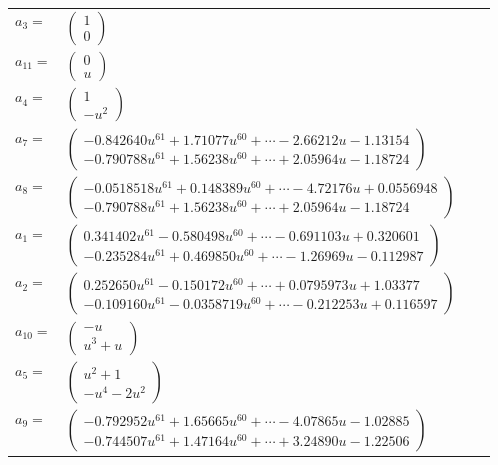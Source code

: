 \documentclass[1p]{elsarticle_modified}
\theoremstyle{definition}
\begin{document}
\begin{tabular}{m{7pt} m{180pt} m{7pt} m{180pt} }
\flushright $a_{3}=$&$\begin{pmatrix}1\\0\end{pmatrix}$ \\
\flushright $a_{11}=$&$\begin{pmatrix}0\\u\end{pmatrix}$ \\
\flushright $a_{4}=$&$\begin{pmatrix}1\\- u^2\end{pmatrix}$ \\
\flushright $a_{7}=$&$\begin{pmatrix}-0.842640 u^{61}+1.71077 u^{60}+\cdots-2.66212 u-1.13154\\-0.790788 u^{61}+1.56238 u^{60}+\cdots+2.05964 u-1.18724\end{pmatrix}$ \\
\flushright $a_{8}=$&$\begin{pmatrix}-0.0518518 u^{61}+0.148389 u^{60}+\cdots-4.72176 u+0.0556948\\-0.790788 u^{61}+1.56238 u^{60}+\cdots+2.05964 u-1.18724\end{pmatrix}$ \\
\flushright $a_{1}=$&$\begin{pmatrix}0.341402 u^{61}-0.580498 u^{60}+\cdots-0.691103 u+0.320601\\-0.235284 u^{61}+0.469850 u^{60}+\cdots-1.26969 u-0.112987\end{pmatrix}$ \\
\flushright $a_{2}=$&$\begin{pmatrix}0.252650 u^{61}-0.150172 u^{60}+\cdots+0.0795973 u+1.03377\\-0.109160 u^{61}-0.0358719 u^{60}+\cdots-0.212253 u+0.116597\end{pmatrix}$ \\
\flushright $a_{10}=$&$\begin{pmatrix}- u\\u^3+u\end{pmatrix}$ \\
\flushright $a_{5}=$&$\begin{pmatrix}u^2+1\\- u^4-2 u^2\end{pmatrix}$ \\
\flushright $a_{9}=$&$\begin{pmatrix}-0.792952 u^{61}+1.65665 u^{60}+\cdots-4.07865 u-1.02885\\-0.744507 u^{61}+1.47164 u^{60}+\cdots+3.24890 u-1.22506\end{pmatrix}$ \\

\end{tabular}
\end{document}
